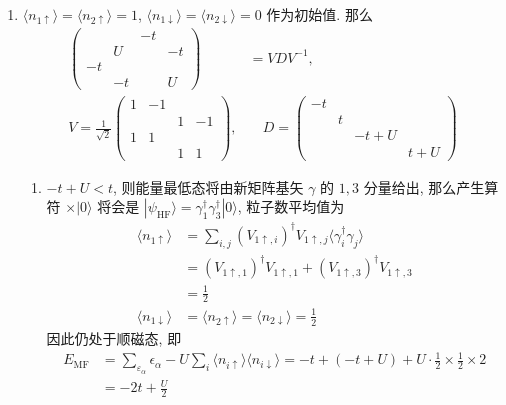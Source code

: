 \documentclass[../../main.tex]{subfiles}
\begin{document}
\begin{enumerate}
  \item $\langle n_{1\uparrow}\rangle = \langle n_{2\uparrow}\rangle = 1$, $\langle n_{1\downarrow}\rangle = \langle n_{2\downarrow}\rangle = 0$ 作为初始值. 那么
  \begin{align*}
    \begin{pmatrix}
       &  & -t & \\
       & U & & -t\\
      -t & &  &  \\
       & -t &  & U
    \end{pmatrix} &= VDV^{-1},\\
    V = \frac{1}{\sqrt{2}}\begin{pmatrix}
      1 & -1 &   &  \\
        &    & 1 & -1\\
      1 &  1 &   &   \\
        &    & 1 &  1
    \end{pmatrix},&\quad D = \begin{pmatrix}
      -t &  &  & \\
       & t & & \\
       & & -t+U &  \\
       & & & t + U
    \end{pmatrix}
  \end{align*}
  \begin{enumerate}
    \item $-t+U < t$, 则能量最低态将由新矩阵基矢 $\gamma$ 的 $1,3$ 分量给出, 那么产生算符 $\times|0\rangle$ 将会是 $|\psi_{\text{HF}}\rangle = \gamma_{1}^{\dagger}\gamma_{3}^{\dagger}|0\rangle$, 粒子数平均值为
    \begin{align*}
      \langle n_{1\uparrow}\rangle &= \sum_{i,j}(V_{1\uparrow,i})^{\dagger}V_{1\uparrow,j}\langle\gamma_{i}^{\dagger}\gamma_{j}\rangle\\
      &= (V_{1\uparrow,1})^{\dagger}V_{1\uparrow,1} + (V_{1\uparrow,3})^{\dagger}V_{1\uparrow,3} \\
      &= \frac{1}{2}\\
      \langle n_{1\downarrow}\rangle &= \langle n_{2\uparrow}\rangle = \langle n_{2\downarrow}\rangle = \frac{1}{2}
    \end{align*}
    因此仍处于顺磁态, 即 
    \begin{align*}
      E_{\text{MF}} &= \sum_{\varepsilon_{\alpha}}\epsilon_{\alpha} - U\sum_{i}\langle n_{i\uparrow}\rangle\langle n_{i\downarrow}\rangle = -t + (-t + U) + U\cdot\frac{1}{2}\times\frac{1}{2}\times 2 \\
      &= -2t + \frac{U}{2}
    \end{align*}


\end{enumerate}
\end{enumerate}
\end{document}
